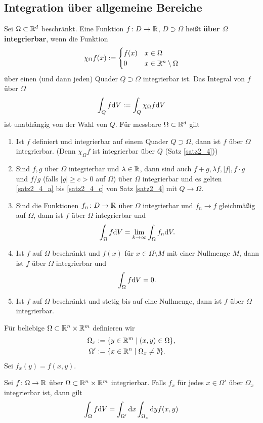 \subsection{Integration über allgemeine Bereiche}
Sei $\Omega \subset\mathbb{R}^d$ beschränkt. Eine Funktion $f \colon D \to \mathbb{R}$, $D \supset \Omega$ heißt \textbf{über $\Omega$ integrierbar}, wenn die Funktion
\[\chi_\Omega f(x) := \begin{cases}
	f(x) & x \in \Omega\\
	0 & x \in \mathbb{R}^n \setminus \Omega
\end{cases}\] 
über einen (und dann jeden) Quader $Q \supset \Omega$ integrierbar ist. Das Integral von $f$ über $\Omega$
\[\int_Q f\mathrm{d} V := \int_Q \chi_\Omega f \mathrm{d} V\]
ist unabhängig von der Wahl von $Q$. Für messbare $\Omega \subset \mathbb{R}^d$ gilt
\begin{enumerate}[label=(\arabic*)]
	\item Ist $f$ definiert und integrierbar auf einem Quader $Q\supset \Omega$, dann ist $f$ über $\Omega$ integrierbar. (Denn $\chi_\Omega f$ ist integrierbar über $Q$ (Satz \ref{satz2_4}))
	\item Sind $f, g$ über $\Omega$ integrierbar und $\lambda \in \mathbb{R}$, dann sind auch $f+g, \lambda f, |f|, f\cdot g$ und $f/g$ (falls $|g| \geq c > 0$ auf $\Omega$) über $\Omega$ integrierbar und es gelten \ref{satz2_4_a} bis \ref{satz2_4_c} von Satz \ref{satz2_4} mit $Q \to \Omega$.
	\item Sind die Funktionen $f_n \colon D \to \mathbb{R}$ über $\Omega$ integrierbar und $f_n \to f$ gleichmäßig auf $\Omega$, dann ist $f$ über $\Omega$ integrierbar und 
	\[\int_\Omega f \mathrm{d} V = \lim_{k\to \infty} \int_\Omega f_n \mathrm{d} V.\]
	\item Ist $f$ auf $\Omega$ beschränkt und $f(x)$ für $x \in \Omega \setminus M$ mit einer Nullmenge $M$, dann ist $f$ über $\Omega$ integrierbar und
	\[\int_\Omega f \mathrm{d} V = 0.\]
	\item Ist $f$ auf $\Omega$ beschränkt und stetig bis auf eine Nullmenge, dann ist $f$ über $\Omega$ integrierbar.
\end{enumerate}
Für beliebige $\Omega \subset \mathbb{R}^n \times \mathbb{R}^m$ definieren wir
\begin{align*}
	\Omega_x &:= \{y \in \mathbb{R}^m \mid (x,y) \in \Omega\},\\
	\Omega'  &:= \{x \in \mathbb{R}^n \mid \Omega_x \neq \emptyset\}.
\end{align*}
Sei $f_x(y) = f(x,y)$.
\begin{thm}[Fubini]\label{thm2_16}
	Sei $f \colon \Omega \to \mathbb{R}$ über $\Omega \subset \mathbb{R}^n \times \mathbb{R}^m$ integrierbar. Falls $f_x$ für jedes $x \in \Omega'$ über $\Omega_x$ integrierbar ist, dann gilt
	\[\int_\Omega f \mathrm{d} V = \int_{\Omega'} \mathrm{d} x \int_{\Omega_x} \mathrm{d} y f(x,y)\]
\end{thm}
